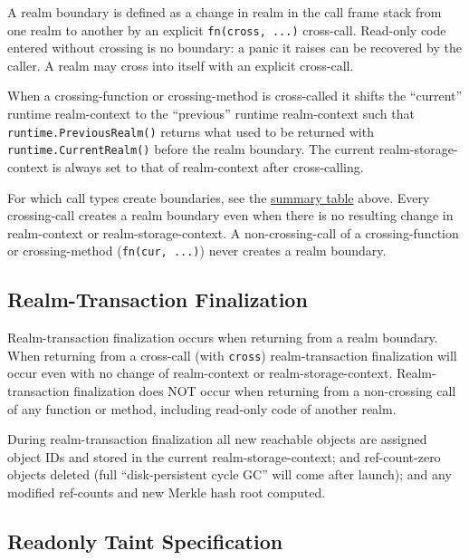 \documentclass[12pt,a4paper]{article}
\newcommand{\passthrough}[1]{#1}
\begin{document}
A realm boundary is defined as a change in realm in the call frame stack
from one realm to another by an explicit
\passthrough{\lstinline!fn(cross, ...)!} cross-call. Read-only code
entered without crossing is no boundary: a panic it raises can be
recovered by the caller. A realm may cross into itself with an explicit
cross-call.

When a crossing-function or crossing-method is cross-called it shifts
the ``current'' runtime realm-context to the ``previous'' runtime
realm-context such that
\passthrough{\lstinline!runtime.PreviousRealm()!} returns what used to
be returned with \passthrough{\lstinline!runtime.CurrentRealm()!} before
the realm boundary. The current realm-storage-context is always set to
that of realm-context after cross-calling.

For which call types create boundaries, see the
\hyperref[realm-context-and-realm-storage-context]{summary table} above.
Every crossing-call creates a realm boundary even when there is no
resulting change in realm-context or realm-storage-context. A
non-crossing-call of a crossing-function or crossing-method
(\passthrough{\lstinline!fn(cur, ...)!}) never creates a realm boundary.

\subsection{Realm-Transaction
Finalization}\label{realm-transaction-finalization}

Realm-transaction finalization occurs when returning from a realm
boundary. When returning from a cross-call (with
\passthrough{\lstinline!cross!}) realm-transaction finalization will
occur even with no change of realm-context or realm-storage-context.
Realm-transaction finalization does NOT occur when returning from a
non-crossing call of any function or method, including read-only
code of another realm.

During realm-transaction finalization all new reachable objects are
assigned object IDs and stored in the current realm-storage-context; and
ref-count-zero objects deleted (full ``disk-persistent cycle GC'' will
come after launch); and any modified ref-counts and new Merkle hash root
computed.

\subsection{Readonly Taint
Specification}\label{readonly-taint-specification}
\end{document}
